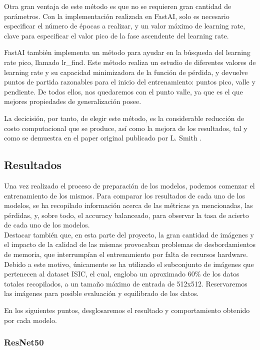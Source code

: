 Otra gran ventaja de este método es que no se requieren gran cantidad de parámetros. Con la implementación realizada en FastAI, solo es necesario especificar el número de épocas a realizar, y un valor máximo de learning rate, clave para especificar el valor pico de la fase ascendente del learning rate.

FastAI también implementa un método para ayudar en la búsqueda del learning rate pico, llamado lr\_find. Este método realiza un estudio de diferentes valores de learning rate y su capacidad minimizadora de la función de pérdida, y devuelve puntos de partida razonables para el inicio del entrenamiento: puntos pico, valle y pendiente. De todos ellos, nos quedaremos con el punto valle, ya que es el que mejores propiedades de generalización posee.

La decicisión, por tanto, de elegir este método, es la considerable reducción de costo computacional que se produce, así como la mejora de los resultados, tal y como se demuestra en el paper original publicado por L. Smith \cite{smith2018disciplined}. 

\subsection{Resultados}

Una vez realizado el proceso de preparación de los modelos, podemos comenzar el entrenamiento de los mismos. Para comparar los resultados de cada uno de los modelos, se ha recopilado información acerca de las métricas ya mencionadas, las pérdidas, y, sobre todo, el accuracy balanceado, para observar la tasa de acierto de cada uno de los modelos.\\

Destacar también que, en esta parte del proyecto, la gran cantidad de imágenes y el impacto de la calidad de las mismas provocaban problemas de desbordamientos de memoria, que interrumpían el entrenamiento por falta de recursos hardware. Debido a este motivo, únicamente se ha utilizado el subconjunto de imágenes que pertenecen al dataset ISIC, el cual, engloba un aproximado 60\% de los datos totales recopilados, a un tamaño máximo de entrada de 512x512. Reservaremos las imágenes para posible evaluación y equilibrado de los datos.

En los siguientes puntos, desglosaremos el resultado y comportamiento obtenido por cada modelo.

\subsubsection{ResNet50}

